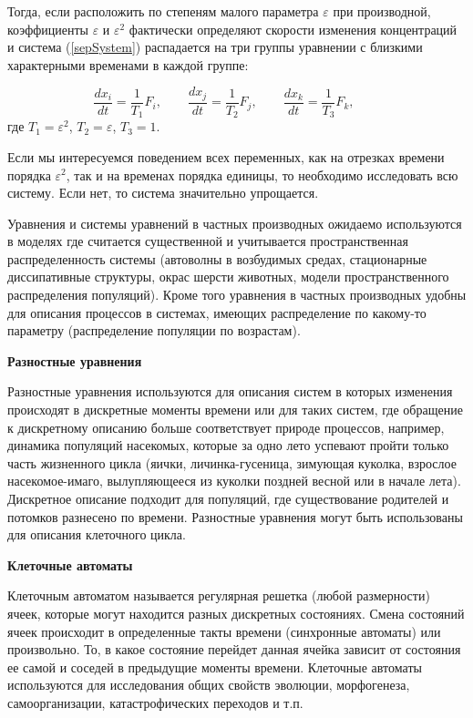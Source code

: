 \documentclass[12pt,a4paper,oneside]{book}
\begin{document}
Тогда, если расположить по степеням малого параметра $\varepsilon$ при производной, коэффициенты $\varepsilon$ и $\varepsilon^2$ фактически определяют скорости изменения концентраций и система (\ref{sepSystem}) распадается на три группы уравнении с близкими характерными временами в каждой группе:

\begin{equation}
	\label{sepSystem2}
	\frac{dx_i}{dt} = \frac{1}{T_1} F_i, \qquad
	\frac{dx_j}{dt} = \frac{1}{T_2} F_j, \qquad
	\frac{dx_k}{dt} = \frac{1}{T_3} F_k, \qquad
\end{equation}
где $T_1 = \varepsilon^2$, $T_2 = \varepsilon$, $T_3 = 1$.

Если мы интересуемся поведением всех переменных, как на отрезках времени порядка $\varepsilon^2$, так и на временах порядка единицы, то необходимо исследовать всю систему. Если нет, то система значительно упрощается.



Уравнения и системы уравнений в частных производных ожидаемо используются в моделях где считается существенной и учитывается пространственная распределенность системы (автоволны в возбудимых средах, стационарные диссипативные структуры, окрас шерсти животных, модели пространственного распределения популяций). Кроме того уравнения в частных производных удобны для описания процессов в системах, имеющих распределение по какому-то параметру (распределение популяции по возрастам). 

{\bf Разностные уравнения}

Разностные уравнения используются для описания систем в которых изменения происходят в дискретные моменты времени или для таких систем, где обращение к дискретному описанию больше соответствует природе процессов, например, динамика популяций насекомых, которые за одно лето успевают пройти только часть жизненного цикла (яички, личинка-гусеница, зимующая куколка, взрослое насекомое-имаго, вылупляющееся из куколки поздней весной или в начале лета). Дискретное описание подходит для популяций, где существование родителей и потомков разнесено по времени. Разностные уравнения могут быть использованы для описания клеточного цикла.


{\bf Клеточные автоматы }

Клеточным автоматом называется регулярная решетка (любой размерности) ячеек, которые могут находится разных дискретных состояниях. Смена состояний ячеек происходит в определенные такты времени (синхронные автоматы) или произвольно. То, в какое состояние перейдет данная ячейка зависит от состояния ее самой и соседей в предыдущие моменты времени. Клеточные автоматы используются для исследования общих свойств эволюции, морфогенеза, самоорганизации, катастрофических переходов и т.п.
\end{document}
